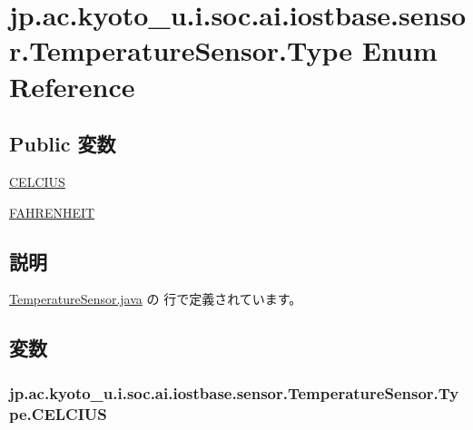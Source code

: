 \hypertarget{enumjp_1_1ac_1_1kyoto__u_1_1i_1_1soc_1_1ai_1_1iostbase_1_1sensor_1_1_temperature_sensor_1_1_type}{\section{jp.\-ac.\-kyoto\-\_\-u.\-i.\-soc.\-ai.\-iostbase.\-sensor.\-Temperature\-Sensor.\-Type Enum Reference}
\label{enumjp_1_1ac_1_1kyoto__u_1_1i_1_1soc_1_1ai_1_1iostbase_1_1sensor_1_1_temperature_sensor_1_1_type}
}
\subsection*{Public 変数}
\begin{DoxyCompactItemize}
\item 
\hyperlink{enumjp_1_1ac_1_1kyoto__u_1_1i_1_1soc_1_1ai_1_1iostbase_1_1sensor_1_1_temperature_sensor_1_1_type_a773a60a751af4c5138634b8b2564de6c}{C\-E\-L\-C\-I\-U\-S}
\item 
\hyperlink{enumjp_1_1ac_1_1kyoto__u_1_1i_1_1soc_1_1ai_1_1iostbase_1_1sensor_1_1_temperature_sensor_1_1_type_a871402cbd503faa725f464f38d735955}{F\-A\-H\-R\-E\-N\-H\-E\-I\-T}
\end{DoxyCompactItemize}


\subsection{説明}


 \hyperlink{_temperature_sensor_8java_source}{Temperature\-Sensor.\-java} の  行で定義されています。



\subsection{変数}
\hypertarget{enumjp_1_1ac_1_1kyoto__u_1_1i_1_1soc_1_1ai_1_1iostbase_1_1sensor_1_1_temperature_sensor_1_1_type_a773a60a751af4c5138634b8b2564de6c}{
\subsubsection[{C\-E\-L\-C\-I\-U\-S}]{\setlength{\rightskip}{0pt plus 5cm}jp.\-ac.\-kyoto\-\_\-u.\-i.\-soc.\-ai.\-iostbase.\-sensor.\-Temperature\-Sensor.\-Type.\-C\-E\-L\-C\-I\-U\-S}}\label{enumjp_1_1ac_1_1kyoto__u_1_1i_1_1soc_1_1ai_1_1iostbase_1_1sensor_1_1_temperature_sensor_1_1_type_a773a60a751af4c5138634b8b2564de6c}


